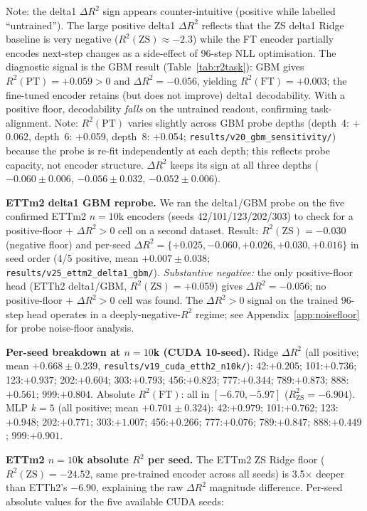 Note: the delta1 $\Delta R^2$ sign appears counter-intuitive (positive while
labelled ``untrained'').  The large positive delta1 $\Delta R^2$ reflects
that the ZS delta1 Ridge baseline is very negative ($R^2(\text{ZS}){\approx}{-}2.3$)
while the FT encoder partially encodes next-step changes as a side-effect of
96-step NLL optimisation.  The diagnostic signal is the GBM result
(Table~\ref{tab:r2task}): GBM gives $R^2(\text{PT}){=}{+}0.059{>}0$
and $\Delta R^2{=}{-}0.056$, yielding $R^2(\text{FT}){=}{+}0.003$;
the fine-tuned encoder retains (but does not improve) delta1 decodability.
With a positive floor, decodability \emph{falls} on the untrained readout,
confirming task-alignment.
Note: $R^2(\text{PT})$ varies slightly across GBM probe depths
(depth~4: $+$0.062, depth~6: $+$0.059, depth~8: $+$0.054;
\texttt{results/v20\_gbm\_sensitivity/}) because the probe is re-fit
independently at each depth; this reflects probe capacity, not encoder
structure.  $\Delta R^2$ keeps its sign at all three depths
($-0.060{\pm}0.006$, $-0.056{\pm}0.032$, $-0.052{\pm}0.006$).

\textbf{ETTm2 delta1 GBM reprobe.}
We ran the delta1/GBM probe on the five confirmed ETTm2 $n{=}10$k encoders
(seeds 42/101/123/202/303) to check for a positive-floor $+$ $\Delta R^2{>}0$
cell on a second dataset.
Result: $R^2(\text{ZS}){=}{-}0.030$ (negative floor) and per-seed
$\Delta R^2{=}\{+0.025, -0.060, +0.026, +0.030, +0.016\}$ in seed order
(4/5 positive, mean $+0.007{\pm}0.038$;
\texttt{results/v25\_ettm2\_delta1\_gbm/}).  \emph{Substantive negative:} the
only positive-floor head (ETTh2 delta1/GBM, $R^2(\text{ZS}){=}{+}0.059$) gives
$\Delta R^2{=}{-}0.056$; no positive-floor $+$ $\Delta R^2{>}0$ cell was found.
The $\Delta R^2{>}0$ signal on the trained 96-step head operates in a
deeply-negative-$R^2$ regime; see Appendix~\ref{app:noisefloor} for probe
noise-floor analysis.

\textbf{Per-seed breakdown at $n{=}10$k (CUDA 10-seed).}
Ridge $\Delta R^2$ (all positive; mean $+0.668{\pm}0.239$,
\texttt{results/v19\_cuda\_etth2\_n10k/}):
42:$+0.205$; 101:$+0.736$; 123:$+0.937$; 202:$+0.604$; 303:$+0.793$;
456:$+0.823$; 777:$+0.344$; 789:$+0.873$; 888:$+0.561$; 999:$+0.804$.
Absolute $R^2(\text{FT})$: all in $[-6.70, -5.97]$ ($R^2_{\text{ZS}}{=}-6.904$).
MLP $k{=}5$ (all positive; mean $+0.701{\pm}0.324$):
42:$+0.979$; 101:$+0.762$; 123:$+0.948$; 202:$+0.771$; 303:$+1.007$;
456:$+0.266$; 777:$+0.076$; 789:$+0.847$; 888:$+0.449$; 999:$+0.901$.

\textbf{ETTm2 $n{=}10$k absolute $R^2$ per seed.}
The ETTm2 ZS Ridge floor ($R^2(\text{ZS}){=}-24.52$, same pre-trained
encoder across all seeds) is 3.5$\times$ deeper than ETTh2's $-6.90$,
explaining the raw $\Delta R^2$ magnitude difference.
Per-seed absolute values for the five available CUDA seeds:

